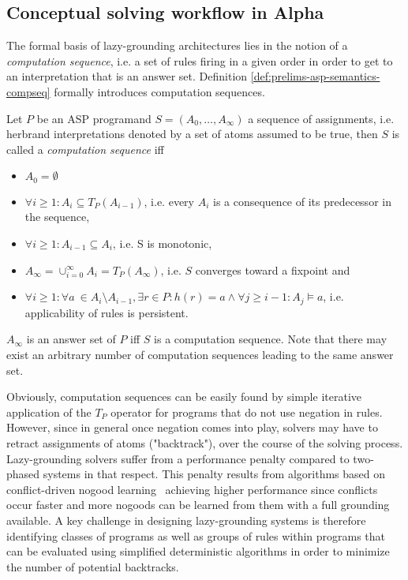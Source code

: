 \subsection{Conceptual solving workflow in Alpha}

The formal basis of lazy-grounding architectures lies in the notion of a \emph{computation sequence}, i.e. a set of rules firing in a given order in order to get to an interpretation that is an answer set. Definition \ref{def:prelims-asp-semantics-compseq} formally introduces computation sequences.

\begin{definition}
\label{def:prelims-asp-semantics-compseq}
Let $P$ be an ASP programand $S = (A_0,\ldots,A_{\infty})$ a sequence of assignments, i.e. herbrand interpretations denoted by a set of atoms assumed to be true, then $S$ is called a \emph{computation sequence} iff
\begin{itemize}
	\item $A_0 = \emptyset$
	\item $\forall i \geq 1: A_i \subseteq T_P(A_{i - 1})$, i.e. every $A_i$ is a consequence of its predecessor in the sequence,
	\item $\forall i \geq 1: A_{i - 1} \subseteq A_{i}$, i.e. S is monotonic,
	\item $A_{\infty} = \cup^{\infty}_{i = 0} A_i = T_P(A_{\infty})$, i.e. $S$ converges toward a fixpoint and
	\item $\forall i \geq 1: \forall a \ \in A_i \setminus A_{i - 1}, \exists r \in P: h(r) = a \land \forall j \geq i - 1: A_j \models a$, i.e. applicability of rules is persistent.
\end{itemize}
$A_{\infty}$ is an answer set of $P$ iff $S$ is a computation sequence. Note that there may exist an arbitrary number of computation sequences leading to the same answer set.
\end{definition}

Obviously, computation sequences can be easily found by simple iterative application of the $T_P$ operator for programs that do not use negation in rules. However, since in general once negation comes into play, solvers may have to retract assignments of atoms ("backtrack"), over the course of the solving process.  Lazy-grounding solvers suffer from a performance penalty compared to two-phased systems in that respect. This penalty results from algorithms based on conflict-driven nogood learning~\cite{clasp-cdnl} achieving higher performance since conflicts occur faster and more nogoods can be learned from them with a full grounding available. A key challenge in designing lazy-grounding systems is therefore identifying classes of programs as well as groups of rules within programs that can be evaluated using simplified deterministic algorithms in order to minimize the number of potential backtracks.

